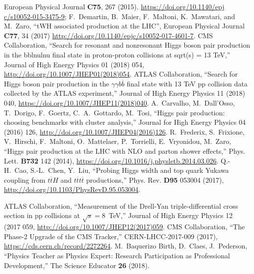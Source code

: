 \begin{thebibliography}{99}
  European Physical Journal {\bf C75}, 267
  (2015). \url{https://doi.org/10.1140/epj c/s10052-015-3475-9};
  F.~Demartin, B.~Maier, F.~Maltoni, K.~Mawatari, and M.~Zaro, ``tWH
  associated production at the LHC'', European Physical Journal {\bf C77}, 34 (2017)
  \url{http://doi.org/10.1140/epjc/s10052-017-4601-7}. 
%
%
    CMS Collaboration, ``Search for resonant and nonresonant Higgs boson pair production in the bblnulnu final state in proton-proton collisions at sqrt(s) = 13 TeV,'' 
    Journal of High Energy Physics 01 (2018) 054, \url{http://doi.org/10.1007/JHEP01(2018)054}.
%
    ATLAS Collaboration, ``Search for Higgs boson pair production in the $\gamma\gamma b\overline{b}$ final state with 13 TeV pp collision data collected by the ATLAS experiment,''
    Journal of High Energy Physics 11 (2018) 040, \url{https://doi.org/10.1007/JHEP11(2018)040}.
%
    A.~Carvalho, M.~Dall’Osso, T.~Dorigo, F.~Goertz, C.~A.~Gottardo, M.~Tosi,
    ``Higgs pair production: choosing benchmarks with cluster analysis,''
    Journal for High Energy Physics 04 (2016) 126, \url{http://doi.org/10.1007/JHEP04(2016)126}.
%
%
%
 R.~Frederix, S.~Frixione, V.~Hirschi,
  F.~Maltoni, O.~Mattelaer, P.~Torrielli, E.~Vryonidou, M.~Zaro, ``Higgs
  pair production at the LHC with NLO and parton shower effects,''
  Phys. Lett. {\bf B732} 142 (2014), \url{ https://doi.org/10.1016/j.physletb.2014.03.026}.
    Q.-H.~Cao, S.-L.~Chen, Y.~Liu,
    ``Probing Higgs width and top quark Yukawa coupling from $t\overline{t}H$ and $t\overline{t}t\overline{t}$ productions,''
    Phys. Rev. {\bf D95} 053004 (2017), \url{http://doi.org/10.1103/PhysRevD.95.053004}.

%
    ATLAS Collaboration, ``Measurement of the Drell-Yan triple-differential cross section in pp collisions at $\sqrt{s}=$8~TeV,''
    Journal of High Energy Physics 12 (2017 059, \url{http://doi.org/10.1007/JHEP12(2017)059}.
%
CMS Collaboration, ``The Phase-2 Upgrade of the CMS Tracker,'' CERN-LHCC-2017-009 (2017),
\url{https://cds.cern.ch/record/2272264}.
%
 M.~Baquerizo Birth, D.~Claes, J.~Pederson, ``Physics Teacher as Physics Expert: Research Participation as Professional Development,''  The Science Educator {\bf 26} (2018).
\end{thebibliography}
